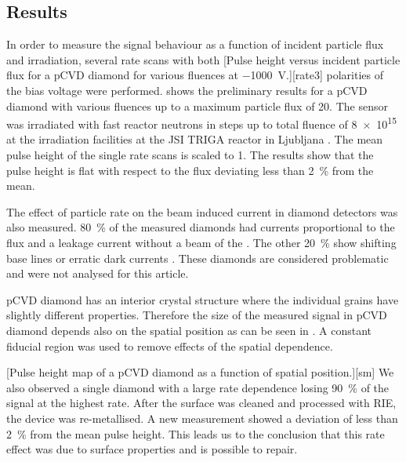 \subsection{Results}
In order to measure the signal behaviour as a function of incident particle flux and irradiation, several rate scans with both 
[Pulse height versus incident particle flux for a \ac{pCVD} diamond for various fluences at \SI{-1000}{\volt}.][rate3]
polarities of the bias voltage were performed.  shows the preliminary results for a \ac{pCVD} diamond with 
various fluences up to a maximum particle flux of \SI{20}{\mhzcm}. The sensor was irradiated with fast reactor neutrons in steps up to total fluence of \SI{8e15}{\ncm} at the irradiation facilities at the JSI TRIGA reactor in Ljubljana \cite{irrad}. The mean pulse height of the single rate scans is scaled to 1. The results show that the pulse height is flat with respect to the flux deviating less than \SI{2}{\%} from the mean.\par 
The effect of particle rate on the beam induced current in diamond detectors was also measured. \SI{80}{\%} of the measured diamonds had currents proportional to the flux and a leakage current without a beam of the . The other \SI{20}{\%} show shifting base lines or erratic dark currents \cite{erratic}. These diamonds are considered problematic and were not analysed for this article.\par
\ac{pCVD} diamond has an interior crystal structure where the individual grains have slightly different properties. Therefore the size of the measured signal in \ac{pCVD} diamond depends also on the spatial position as can be seen in . A constant fiducial region was used to remove effects of the spatial dependence. \par %
{}[Pulse height map of a \ac{pCVD} diamond as a function of spatial position.][sm]
We also observed a single diamond with a large rate dependence losing \SI{90}{\%} of the signal at the highest rate. After the surface was cleaned and processed with \ac{RIE}, the device was re-metallised. A new measurement showed a deviation of less than \SI{2}{\%} from the mean pulse height. This leads us to the conclusion that this rate effect was due to surface properties and is possible to repair.
